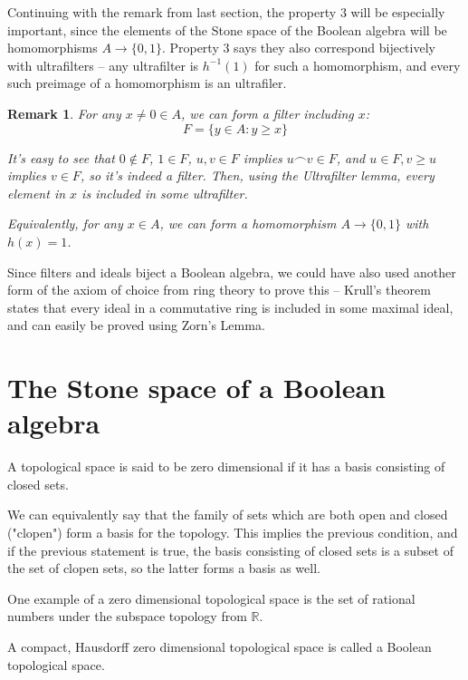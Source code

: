 \documentclass{article}
\newtheorem*{remark}{Remark}
\begin{document}
      Continuing with the remark from last section, the property $3$ will be
      especially important, since the elements of the Stone space of the
      Boolean algebra will be homomorphisms $A \to \{0,1\}$. Property 3 says
      they also correspond bijectively with ultrafilters -- any ultrafilter is
      $h^{-1}(1)$ for such a homomorphism, and every such preimage of a
      homomorphism is an ultrafiler.

      \begin{remark}
      For any $x \neq 0 \in A$, we can form a filter including $x$:
      \[ F = \{y \in A: y \geq x\}\]

      It's easy to see that $0 \notin F$, $1 \in F$, $u, v \in F$ implies $u
      \frown v \in F$, and $u \in F, v \geq u$ implies $v \in F$, so it's indeed
      a filter. Then, using the Ultrafilter lemma, every element in $x$ is
      included in some ultrafilter.

      Equivalently, for any $x \in A$, we can form a homomorphism $A \rightarrow
      \{0,1\}$ with $h(x)=1$.
      \end{remark}

      Since filters and ideals biject a Boolean algebra, we could have also used
      another form of the axiom of choice from ring theory to prove this --
      Krull's theorem states that every ideal in a commutative ring is included
      in some maximal ideal, and can easily be proved using Zorn's Lemma.


    \section{The Stone space of a Boolean algebra}

        A topological space is said to be zero dimensional if it has a basis
        consisting of closed sets.

        We can equivalently say that the family of sets which are both open and
        closed ("clopen") form a basis for the topology. This implies
        the previous condition, and if the previous statement is true, the basis
        consisting of closed sets is a subset of the set of clopen sets, so the
        latter forms a basis as well.

        One example of a zero dimensional topological space is the set of
        rational numbers under the subspace topology from $\mathbb{R}$.

        A compact, Hausdorff zero dimensional topological space is called a
        Boolean topological space.
\end{document}
